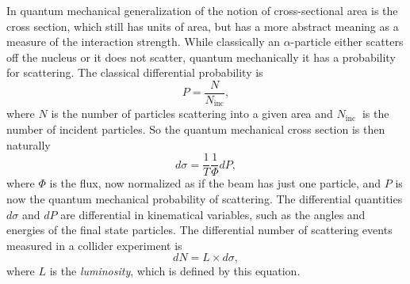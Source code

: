 In quantum mechanical generalization of the notion of cross-sectional area is the cross section, which still has units of area, but has a more abstract meaning as a measure of the interaction strength. 
While classically an $\alpha$-particle either scatters off the nucleus or it does not scatter, quantum mechanically it has a probability for scattering. 
The classical differential probability is 
\begin{equation*}
	P=\frac{N}{N_{\text{inc}}},
\end{equation*}
where $N$ is the number of particles scattering into a given area and $N_{\text {inc }}$ is the number of incident particles. 
So the quantum mechanical cross section is then naturally
\begin{equation}
	d \sigma=\frac{1}{T} \frac{1}{\Phi} d P,
\end{equation}
where $\Phi$ is the flux, now normalized as if the beam has just one particle, and $P$ is now the quantum mechanical probability of scattering. 
The differential quantities $d \sigma$ and $d P$ are differential in kinematical variables, such as the angles and energies of the final state particles. 
The differential number of scattering events measured in a collider experiment is
\begin{equation}
	d N=L \times d \sigma,
\end{equation}
where $L$ is the \textit{luminosity}, which is defined by this equation.

